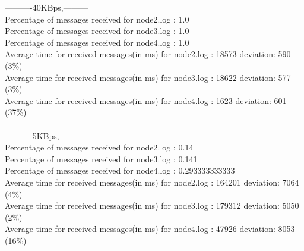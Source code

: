         ----------40KBps,---------\\
        Percentage of messages received for node2.log : 1.0\\
        Percentage of messages received for node3.log : 1.0\\
        Percentage of messages received for node4.log : 1.0\\
        Average time for received messages(in ms) for  node2.log : 18573 	deviation: 590 (3\%)\\
        Average time for received messages(in ms) for  node3.log : 18622 	deviation: 577 (3\%)\\
        Average time for received messages(in ms) for  node4.log : 1623 	deviation: 601 (37\%)\\\\
        ----------5KBps,---------\\
        Percentage of messages received for node2.log : 0.14\\
        Percentage of messages received for node3.log : 0.141\\
        Percentage of messages received for node4.log : 0.293333333333\\
        Average time for received messages(in ms) for  node2.log : 164201 	deviation: 7064 (4\%)\\
        Average time for received messages(in ms) for  node3.log : 179312 	deviation: 5050 (2\%)\\
        Average time for received messages(in ms) for  node4.log : 47926 	deviation: 8053 (16\%)\\\\
